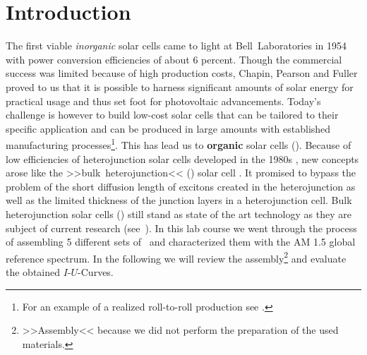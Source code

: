 
\section*{Introduction}%

The first viable \textit{inorganic} solar cells came to light at Bell~Laboratories in 1954 \cite{siliconSC_1}\cite{siliconSC_2} with power conversion efficiencies of about 6 percent. Though the commercial success was limited because of high production costs, Chapin, Pearson and Fuller proved to us that it is possible to harness significant amounts of solar energy for practical usage and thus set foot for photovoltaic advancements.\mypar
Today's challenge is however to build low-cost solar cells that can be tailored to their specific application and can be produced in large amounts with established manufacturing processes\footnote{For an example of a realized roll-to-roll production see \cite{rolltoroll}.}. This has lead us to \textbf{organic} solar cells (\OSC).\mypar
Because of low efficiencies of heterojunction solar cells developed in the 1980s \cite{tang}, new concepts arose like the >>bulk~heterojunction<< (\BHJ) solar cell \cite{heterojunk}. It promised to bypass the problem of the short diffusion length of excitons created in the heterojunction as well as the limited thickness of the junction layers in a heterojunction cell.\mypar
Bulk heterojunction solar cells (\BHSC) still stand as state of the art technology as they are subject of current research (see~\cite{modernbulkhetero}). In this lab course we went through the process of assembling 5 different sets of \BHSC\ and characterized them with the {\os\sefo AM 1.5} global reference spectrum. In the following we will review the assembly\footnote{>>Assembly<< because we did not perform the preparation of the used materials.} and evaluate the obtained $I$-$U$-Curves.

